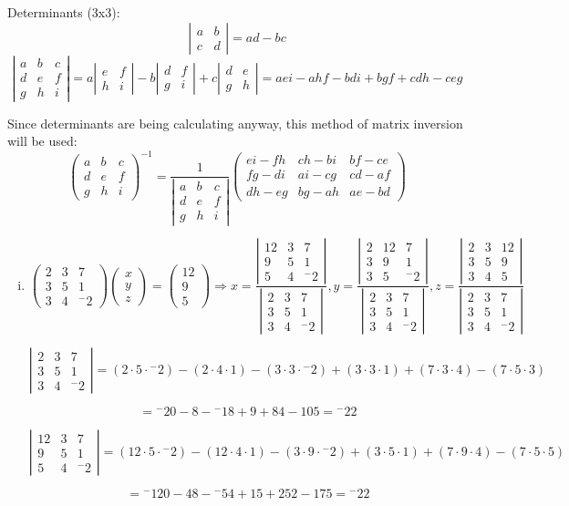 \documentclass{article}
\def\cramersMatrix#1#2#3#4#5#6#7#8#9{
  \def\a{{#1}}
  \def\b{{#2}}
  \def\c{{#3}}
  \def\d{{#4}}
  \def\e{{#5}}
  \def\f{{#6}}
  \def\g{{#7}}
  \def\h{{#8}}
  \def\i{{#9}}
}
\def\cramersVector#1#2#3{
  \def\j{{#1}}
  \def\k{{#2}}
  \def\l{{#3}}
}
\newcommand{\cramers}[0]
{
\[
	\left(
		\begin{array}{ccc}
			\a & \b & \c \\
			\d & \e & \f \\
			\g & \h & \i
		\end{array}
	\right)
	\left(
		\begin{array}{c}
			x \\
			y \\
			z
		\end{array}
	\right)
	=
	\left(
		\begin{array}{c}
			\j \\
			\k \\
			\l
		\end{array}
	\right)
	\Rightarrow
	x=
	\frac
	{
		\left|
			\begin{array}{ccc}
				\j & \b & \c \\
				\k & \e & \f \\
				\l & \h & \i
			\end{array}
		\right|
	}
	{
		\left|
			\begin{array}{ccc}
				\a & \b & \c \\
				\d & \e & \f \\
				\g & \h & \i
			\end{array}
		\right|
	},
	y=
	\frac
	{
		\left|
			\begin{array}{ccc}
				\a & \j & \c \\
				\d & \k & \f \\
				\g & \l & \i
			\end{array}
		\right|
	}
	{
		\left|
			\begin{array}{ccc}
				\a & \b & \c \\
				\d & \e & \f \\
				\g & \h & \i
			\end{array}
		\right|
	},
	z=
	\frac
	{
		\left|
			\begin{array}{ccc}
				\a & \b & \j \\
				\d & \e & \k \\
				\g & \h & \l
			\end{array}
		\right|
	}
	{
		\left|
			\begin{array}{ccc}
				\a & \b & \c \\
				\d & \e & \f \\
				\g & \h & \i
			\end{array}
		\right|
	}
\]
}
\newcommand{\determinant}[9]
{
\cramersMatrix{#1}{#2}{#3}{#4}{#5}{#6}{#7}{#8}{#9}
\[
	\left|
		\begin{array}{ccc}
			\a & \b & \c \\
			\d & \e & \f \\
			\g & \h & \i
		\end{array}
	\right|
	= (\a \cdot \e \cdot \i) - (\a \cdot \h \cdot \f) - (\b \cdot \d \cdot \i) + (\b \cdot \g \cdot \f) + (\c \cdot \d \cdot \h) - (\c \cdot \e \cdot \g)
\]
}
\begin{document}
\begin{enumerate}
Determinants (3x3):
\[
	\left|
		\begin{array}{cc}
			a & b \\
			c & d
		\end{array}
	\right|
	= ad - bc
\]
\[
	\left|
		\begin{array}{ccc}
			a & b & c \\
			d & e & f \\
			g & h & i
		\end{array}
	\right|
	=a
	\left|
		\begin{array}{cc}
			e & f \\
			h & i
		\end{array}
	\right|
	-b
	\left|
		\begin{array}{cc}
			d & f \\
			g & i
		\end{array}
	\right|
	+c
	\left|
		\begin{array}{cc}
			d & e \\
			g & h
		\end{array}
	\right|
	= aei - ahf - bdi + bgf + cdh - ceg
\]

Since determinants are being calculating anyway, this method of matrix inversion will be used:
\[
	\left(
		\begin{array}{ccc}
			a & b & c \\
			d & e & f \\
			g & h & i
		\end{array}
	\right)^{-1}
	=
	\frac{1}
	{
		\left|
			\begin{array}{ccc}
				a & b & c \\
				d & e & f \\
				g & h & i
			\end{array}
		\right|
	}
	\left(
		\begin{array}{ccc}
			ei-fh & ch-bi & bf-ce \\
			fg-di & ai-cg & cd-af \\
			dh-eg & bg-ah & ae-bd
		\end{array}
	\right)
\]

\begin{enumerate}[i.]

\item
\cramersMatrix{2}{3}{7}{3}{5}{1}{3}{4}{{^-}2}
\cramersVector{12}{9}{5}
\cramers

\determinant{2}{3}{7}{3}{5}{1}{3}{4}{{^-}2}
\[
	= {^-}20 - 8 - {^-}18 + 9 + 84 - 105 = {^-}22
\]

\determinant{12}{3}{7}{9}{5}{1}{5}{4}{{^-}2}
\[
	= {^-}120 - 48 - {^-}54 + 15 + 252 - 175 = {^-}22
\]


\end{enumerate}
\end{enumerate}
\end{document}
